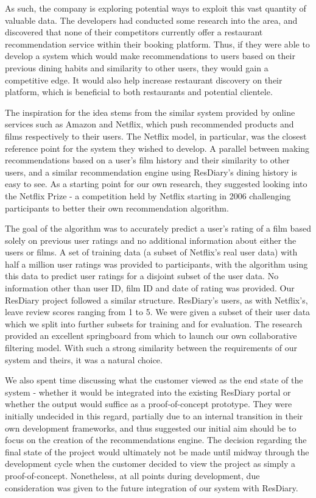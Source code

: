\documentclass{l3proj}
\begin{document}
As such, the company is exploring potential ways to exploit this vast quantity of valuable data. The developers had conducted some research into the area, and discovered that none of their competitors currently offer a restaurant recommendation service within their booking platform. Thus, if they were able to develop a system which would make recommendations to users based on their previous dining habits and similarity to other users, they would gain a competitive edge. It would also help increase restaurant discovery on their platform, which is beneficial to both restaurants and potential clientele. 

The inspiration for the idea stems from the similar system provided by online services such as Amazon and Netflix, which push recommended products and films respectively to their users. The Netflix model, in particular, was the closest reference point for the system they wished to develop. A parallel between making recommendations based on a user's film history and their similarity to other users, and a similar recommendation engine using ResDiary's dining history is easy to see. As a starting point for our own research, they suggested looking into the Netflix Prize - a competition held by Netflix starting in 2006 challenging participants to better their own recommendation algorithm. \cite{Netflix2006}

The goal of the algorithm was to accurately predict a user's rating of a film based solely on previous user ratings and no additional information about either the users or films. A set of training data (a subset of Netflix's real user data) with half a million user ratings was provided to participants, with the algorithm using this data to predict user ratings for a disjoint subset of the user data. No information other than user ID, film ID and date of rating was provided. Our ResDiary project followed a similar structure. ResDiary's users, as with Netflix's, leave review scores ranging from 1 to 5. We were given a subset of their user data which we split into further subsets for training and for evaluation. The research provided an excellent springboard from which to launch our own collaborative filtering model. With such a strong similarity between the requirements of our system and theirs, it was a natural choice.


We also spent time discussing what the customer viewed as the end state of the system - whether it would be integrated into the existing ResDiary portal or whether the output would suffice as a proof-of-concept prototype. They were initially undecided in this regard, partially due to an internal transition in their own development frameworks, and thus suggested our initial aim should be to focus on the creation of the recommendations engine. The decision regarding the final state of the project would ultimately not be made until midway through the development cycle when the customer decided to view the project as simply a proof-of-concept. Nonetheless, at all points during development, due consideration was given to the future integration of our system with ResDiary. 
\end{document}
